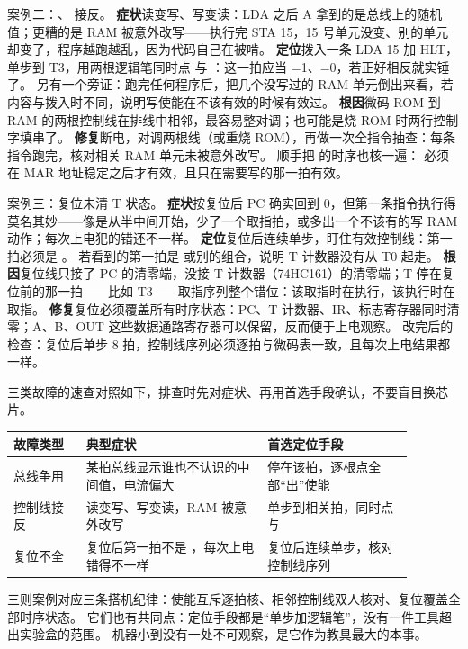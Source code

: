 案例二：、 接反。
\textbf{症状}读变写、写变读：LDA 之后 A 拿到的是总线上的随机值；更糟的是 RAM 被意外改写——执行完 STA 15，15 号单元没变、别的单元却变了，程序越跑越乱，因为代码自己在被啃。
\textbf{定位}拨入一条 LDA 15 加 HLT，单步到 T3，用两根逻辑笔同时点  与 ：这一拍应当 =1、=0，若正好相反就实锤了。
另有一个旁证：跑完任何程序后，把几个没写过的 RAM 单元倒出来看，若内容与拨入时不同，说明写使能在不该有效的时候有效过。
\textbf{根因}微码 ROM 到 RAM 的两根控制线在排线中相邻，最容易整对调；也可能是烧 ROM 时两行控制字填串了。
\textbf{修复}断电，对调两根线（或重烧 ROM），再做一次全指令抽查：每条指令跑完，核对相关 RAM 单元未被意外改写。
顺手把  的时序也核一遍： 必须在 MAR 地址稳定之后才有效，且只在需要写的那一拍有效。

案例三：复位未清 T 状态。
\textbf{症状}按复位后 PC 确实回到 0，但第一条指令执行得莫名其妙——像是从半中间开始，少了一个取指拍，或多出一个不该有的写 RAM 动作；每次上电犯的错还不一样。
\textbf{定位}复位后连续单步，盯住有效控制线：第一拍必须是 。
若看到的第一拍是  或别的组合，说明 T 计数器没有从 T0 起走。
\textbf{根因}复位线只接了 PC 的清零端，没接 T 计数器（74HC161）的清零端；T 停在复位前的那一拍——比如 T3——取指序列整个错位：该取指时在执行，该执行时在取指。
\textbf{修复}复位必须覆盖所有时序状态：PC、T 计数器、IR、标志寄存器同时清零；A、B、OUT 这些数据通路寄存器可以保留，反而便于上电观察。
改完后的检查：复位后单步 8 拍，控制线序列必须逐拍与微码表一致，且每次上电结果都一样。

三类故障的速查对照如下，排查时先对症状、再用首选手段确认，不要盲目换芯片。

\begin{longtable}{L{0.16\linewidth}L{0.40\linewidth}L{0.32\linewidth}}
\toprule
故障类型 & 典型症状 & 首选定位手段 \\
\midrule
总线争用 & 某拍总线显示谁也不认识的中间值，电流偏大 & 停在该拍，逐根点全部“出”使能 \\
控制线接反 & 读变写、写变读，RAM 被意外改写 & 单步到相关拍，同时点  与  \\
复位不全 & 复位后第一拍不是 ，每次上电错得不一样 & 复位后连续单步，核对控制线序列 \\
\bottomrule
\end{longtable}

三则案例对应三条搭机纪律：使能互斥逐拍核、相邻控制线双人核对、复位覆盖全部时序状态。
它们也有共同点：定位手段都是“单步加逻辑笔”，没有一件工具超出实验盒的范围。
机器小到没有一处不可观察，是它作为教具最大的本事。

